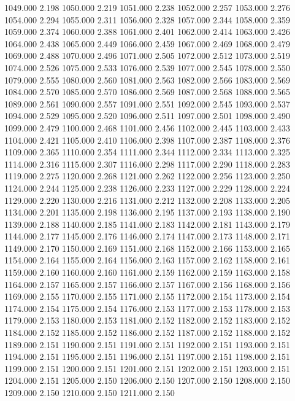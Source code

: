 1049.000 2.198 
1050.000 2.219 
1051.000 2.238 
1052.000 2.257 
1053.000 2.276 
1054.000 2.294 
1055.000 2.311 
1056.000 2.328 
1057.000 2.344 
1058.000 2.359 
1059.000 2.374 
1060.000 2.388 
1061.000 2.401 
1062.000 2.414 
1063.000 2.426 
1064.000 2.438 
1065.000 2.449 
1066.000 2.459 
1067.000 2.469 
1068.000 2.479 
1069.000 2.488 
1070.000 2.496 
1071.000 2.505 
1072.000 2.512 
1073.000 2.519 
1074.000 2.526 
1075.000 2.533 
1076.000 2.539 
1077.000 2.545 
1078.000 2.550 
1079.000 2.555 
1080.000 2.560 
1081.000 2.563 
1082.000 2.566 
1083.000 2.569 
1084.000 2.570 
1085.000 2.570 
1086.000 2.569 
1087.000 2.568 
1088.000 2.565 
1089.000 2.561 
1090.000 2.557 
1091.000 2.551 
1092.000 2.545 
1093.000 2.537 
1094.000 2.529 
1095.000 2.520 
1096.000 2.511 
1097.000 2.501 
1098.000 2.490 
1099.000 2.479 
1100.000 2.468 
1101.000 2.456 
1102.000 2.445 
1103.000 2.433 
1104.000 2.421 
1105.000 2.410 
1106.000 2.398 
1107.000 2.387 
1108.000 2.376 
1109.000 2.365 
1110.000 2.354 
1111.000 2.344 
1112.000 2.334 
1113.000 2.325 
1114.000 2.316 
1115.000 2.307 
1116.000 2.298 
1117.000 2.290 
1118.000 2.283 
1119.000 2.275 
1120.000 2.268 
1121.000 2.262 
1122.000 2.256 
1123.000 2.250 
1124.000 2.244 
1125.000 2.238 
1126.000 2.233 
1127.000 2.229 
1128.000 2.224 
1129.000 2.220 
1130.000 2.216 
1131.000 2.212 
1132.000 2.208 
1133.000 2.205 
1134.000 2.201 
1135.000 2.198 
1136.000 2.195 
1137.000 2.193 
1138.000 2.190 
1139.000 2.188 
1140.000 2.185 
1141.000 2.183 
1142.000 2.181 
1143.000 2.179 
1144.000 2.177 
1145.000 2.176 
1146.000 2.174 
1147.000 2.173 
1148.000 2.171 
1149.000 2.170 
1150.000 2.169 
1151.000 2.168 
1152.000 2.166 
1153.000 2.165 
1154.000 2.164 
1155.000 2.164 
1156.000 2.163 
1157.000 2.162 
1158.000 2.161 
1159.000 2.160 
1160.000 2.160 
1161.000 2.159 
1162.000 2.159 
1163.000 2.158 
1164.000 2.157 
1165.000 2.157 
1166.000 2.157 
1167.000 2.156 
1168.000 2.156 
1169.000 2.155 
1170.000 2.155 
1171.000 2.155 
1172.000 2.154 
1173.000 2.154 
1174.000 2.154 
1175.000 2.154 
1176.000 2.153 
1177.000 2.153 
1178.000 2.153 
1179.000 2.153 
1180.000 2.153 
1181.000 2.152 
1182.000 2.152 
1183.000 2.152 
1184.000 2.152 
1185.000 2.152 
1186.000 2.152 
1187.000 2.152 
1188.000 2.152 
1189.000 2.151 
1190.000 2.151 
1191.000 2.151 
1192.000 2.151 
1193.000 2.151 
1194.000 2.151 
1195.000 2.151 
1196.000 2.151 
1197.000 2.151 
1198.000 2.151 
1199.000 2.151 
1200.000 2.151 
1201.000 2.151 
1202.000 2.151 
1203.000 2.151 
1204.000 2.151 
1205.000 2.150 
1206.000 2.150 
1207.000 2.150 
1208.000 2.150 
1209.000 2.150 
1210.000 2.150 
1211.000 2.150 
